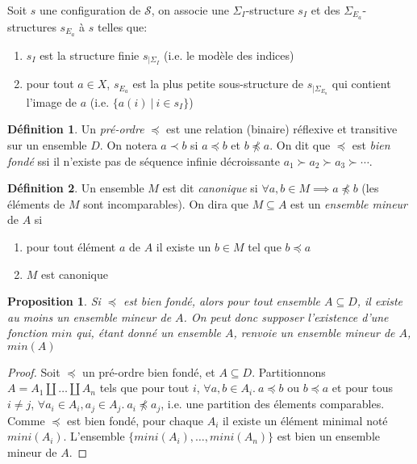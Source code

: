 \documentclass[a4paper, twoside]{scrartcl}
\theoremstyle{plain}%
\newtheorem{prop}[thm]{Proposition}
\theoremstyle{definition}
\newtheorem{defn}{Définition}[section]
\theoremstyle{remark}
\begin{document}
Soit $s$ une configuration de $\mathcal{S}$, on associe une
$\Sigma_I$-structure $s_I$ et des $\Sigma_{E_a}$-structures $s_{E_a}$
à $s$ telles que:
\begin{enumerate}
\item $s_I$ est la structure finie $s_{|\Sigma_I}$ (i.e. le modèle des
  indices)
\item pour tout $a \in X$, $s_{E_a}$ est la plus petite sous-structure
  de $s_{|\Sigma_{E_a}}$ qui contient l'image de $a$ (i.e. $\{a(i) ~|~
  i \in s_I\}$)
\end{enumerate}


\begin{defn}
  Un \emph{pré-ordre} $\preceq$ est une relation (binaire) réflexive
  et transitive sur un ensemble $D$. On notera $a \prec b$ si $a
  \preceq b$ et $b \not \preceq a$. On dit que $\preceq$ est \emph{bien
  fondé} ssi il n'existe pas de séquence infinie décroissante $a_1
  \succ a_2 \succ a_3 \succ \cdots$.
\end{defn}


\begin{defn}
  Un ensemble $M$ est dit \emph{canonique} si $\forall a,b \in M
  \implies a \not \preceq b$ (les éléments de $M$ sont
  incomparables). On dira que $M \subseteq A$ est un \emph{ensemble
    mineur} de $A$ si
  \begin{enumerate}
  \item pour tout élément $a$ de $A$ il existe un $b \in M$ tel que $b \preceq a$
  \item $M$ est canonique
  \end{enumerate}
\end{defn}

\begin{prop}
  Si $\preceq$ est bien fondé, alors pour tout ensemble $A \subseteq D$,
  il existe au moins un ensemble mineur de $A$. On peut donc supposer
  l'existence d'une fonction $min$ qui, étant donné un ensemble $A$,
  renvoie un ensemble mineur de $A$, $min(A)$
\end{prop}

\begin{proof}
  Soit $\preceq$ un pré-ordre bien fondé, et $A \subseteq
  D$. Partitionnons $A = A_1 \coprod \ldots \coprod A_n$ tels que pour
  tout $i$, $\forall a,b \in A_i.~ a \preceq b \text{~ou~} b \preceq
  a$ et pour tous $i \neq j$, $\forall a_i \in A_i, a_j \in A_j.~ a_i
  \not \preceq a_j$, i.e. une partition des élements
  comparables. Comme $\preceq$ est bien fondé, pour chaque $A_i$ il
  existe un élément minimal noté $mini(A_i)$. L'ensemble $\{mini(A_i),
  \ldots, mini(A_n)\}$ est bien un ensemble mineur de $A$.
\end{proof}
\end{document}
